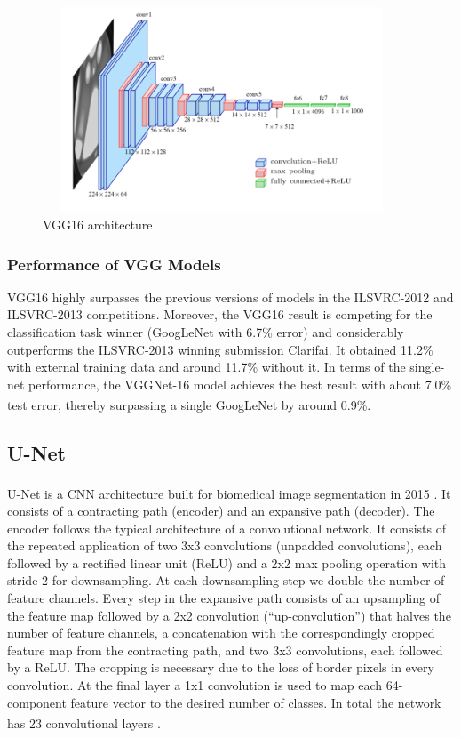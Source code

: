 \begin{figure}[h]
\centering
    \centerline{\includegraphics[width = 4.2in, height = 2.4in]{../images/VGG16-architecture.png}}
    \caption{VGG16 architecture}
\end{figure}

\subsubsection{Performance of VGG Models}
VGG16 highly surpasses the previous versions of models in the ILSVRC-2012 and ILSVRC-2013 competitions. Moreover, the VGG16 result is competing for the classification task winner (GoogLeNet with 6.7\% error) and considerably outperforms the ILSVRC-2013 winning submission Clarifai. It obtained 11.2\% with external training data and around 11.7\% without it. In terms of the single-net performance, the VGGNet-16 model achieves the best result with about 7.0\% test error, thereby surpassing a single GoogLeNet by around 0.9\%. \textsuperscript{\cite{VGG-Gaudenz_Boesch}}

\subsection{U-Net}
U-Net is a CNN architecture built for biomedical image segmentation in 2015 \textsuperscript{\cite{ronneberger2015u}}. It consists of a contracting path (encoder) and an expansive path (decoder). The encoder follows the typical architecture of a convolutional network. It consists of the repeated application of two 3x3 convolutions (unpadded convolutions), each followed by a rectified linear unit (ReLU) and a 2x2 max pooling operation with stride 2 for downsampling. At each downsampling step we double the number of feature channels. Every step in the expansive path consists of an upsampling of the feature map followed by a 2x2 convolution (“up-convolution”) that halves the number of feature channels, a concatenation with the correspondingly cropped feature map from the contracting path, and two 3x3 convolutions, each followed by a ReLU. The cropping is necessary due to the loss of border pixels in every convolution. At the final layer a 1x1 convolution is used to map each 64-component feature vector to the desired number of classes. In total the network has 23 convolutional layers \textsuperscript{\cite{paperswithcode-U-Net}}.

